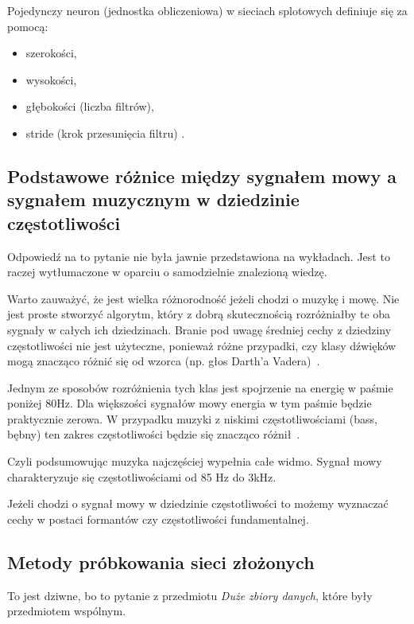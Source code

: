 \documentclass[wi]{zut}
\begin{document}
Pojedynczy neuron (jednostka obliczeniowa) w sieciach splotowych definiuje się za pomocą:

\begin{itemize}
    \item szerokości,
    \item wysokości,
    \item głębokości (liczba filtrów),
    \item stride (krok przesunięcia filtru) \cite{Forczmanski2020}.
\end{itemize}

\subsection{Podstawowe różnice między sygnałem mowy a sygnałem muzycznym w dziedzinie częstotliwości}

Odpowiedź na to pytanie nie była jawnie przedstawiona na wykładach. Jest to raczej wytłumaczone w oparciu o samodzielnie znalezioną wiedzę.
\question

Warto zauważyć, że jest wielka różnorodność jeżeli chodzi o muzykę i mowę. Nie jest proste stworzyć algorytm, który z dobrą skutecznością rozróżniałby te oba sygnały w całych ich dziedzinach. Branie pod uwagę średniej cechy z dziedziny częstotliwości nie jest użyteczne, ponieważ różne przypadki, czy klasy dźwięków mogą znacząco różnić się od wzorca (np. głos Darth'a Vadera)~\cite{hilmar2021speech}.

Jednym ze sposobów rozróżnienia tych klas jest spojrzenie na energię w paśmie poniżej 80Hz. Dla większości sygnałów mowy energia w tym paśmie będzie praktycznie zerowa. W przypadku muzyki z niskimi częstotliwościami (bass, bębny) ten zakres częstotliwości będzie się znacząco różnił~\cite{hilmar2021speech}.

Czyli podsumowując muzyka najczęściej wypełnia całe widmo. Sygnał mowy charakteryzuje się częstotliwościami od 85 Hz do 3kHz.

Jeżeli chodzi o sygnał mowy w dziedzinie częstotliwości to możemy wyznaczać cechy w postaci formantów czy częstotliwości fundamentalnej.

\subsection{Metody próbkowania sieci złożonych}

To jest dziwne, bo to pytanie z przedmiotu \emph{Duże zbiory danych}, które były przedmiotem wspólnym.
\end{document}
